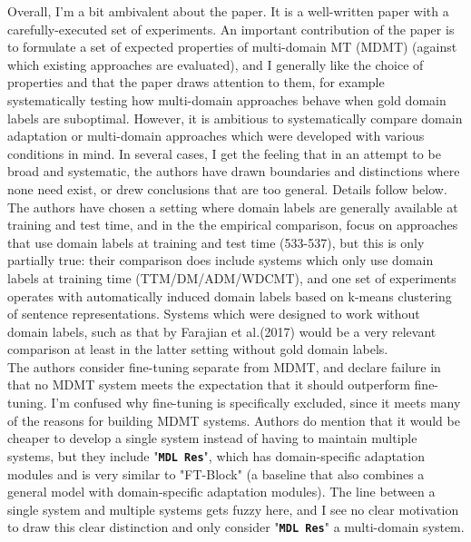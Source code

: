 \documentclass[12pt,times,a4paper,twoside]{article}
\theoremstyle{definition}
\newcommand{\system}[1]{\texttt{\textbf{#1}}}
\begin{document}
Overall, I'm a bit ambivalent about the paper. It is a well-written paper with a carefully-executed set of experiments. An important contribution of the paper is to formulate a set of expected properties of multi-domain MT (MDMT) (against which existing approaches are evaluated), and I generally like the choice of properties and that the paper draws attention to them, for example systematically testing how multi-domain approaches behave when gold domain labels are suboptimal. However, it is ambitious to systematically compare domain adaptation or multi-domain approaches which were developed with various conditions in mind. In several cases, I get the feeling that in an attempt to be broad and systematic, the authors have drawn boundaries and distinctions where none need exist, or drew conclusions that are too general. Details follow below.
\\
The authors have chosen a setting where domain labels are generally
available at training and test time, and in the the empirical comparison, focus on approaches that use domain labels at training and test time (533-537), but this is only partially true: their comparison does include systems which only use domain labels at training time (TTM/DM/ADM/WDCMT), and one set of experiments operates with automatically induced domain labels based on k-means clustering of sentence representations. Systems which were designed to work without domain labels, such as that by Farajian et al.(2017) would be a very relevant comparison at least in the latter setting without gold domain labels.
\\
The authors consider fine-tuning separate from MDMT, and declare failure in that no MDMT system meets the expectation that it should outperform fine-tuning. I'm confused why fine-tuning is specifically excluded, since it meets many of the reasons for building MDMT systems. Authors do mention that it would be cheaper to develop a single system instead of having to maintain multiple systems, but they include "\system{MDL Res}", which has domain-specific adaptation modules and is very similar to "FT-Block" (a baseline that also combines a general model with domain-specific adaptation modules). The line
between a single system and multiple systems gets fuzzy here, and I see no clear motivation to draw this clear distinction and only consider "\system{MDL Res}" a multi-domain system.
\\
\end{document}
